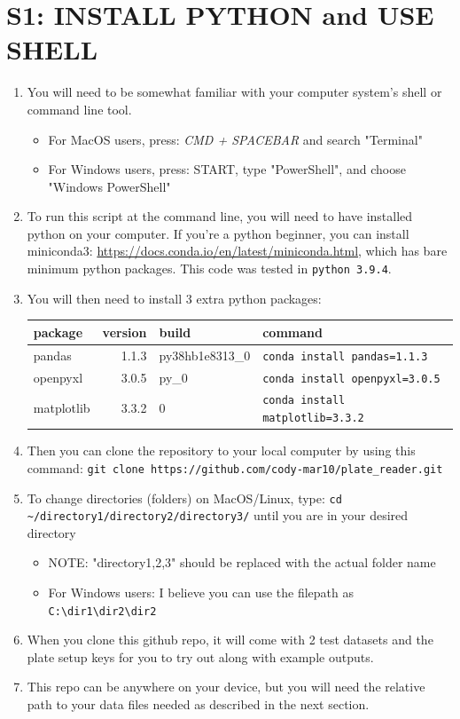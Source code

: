 \documentclass[12pt]{article}
\begin{document}
\section*{S1: INSTALL PYTHON and USE SHELL}
\label{sec:org2a9973f}
\begin{enumerate}
\item You will need to be somewhat familiar with your computer system's shell or command line tool.
\begin{itemize}
\item For MacOS users, press: \emph{CMD + SPACEBAR} and search "Terminal"
\item For Windows users, press: START, type "PowerShell", and choose "Windows PowerShell"
\end{itemize}

\item To run this script at the command line, you will need to have installed python on your computer. If you're a python beginner, you can install miniconda3: \url{https://docs.conda.io/en/latest/miniconda.html}, which has bare minimum python packages. This code was tested in \texttt{python 3.9.4}.

\item You will then need to install 3 extra python packages:
\begin{center}
\begin{tabular}{lrll}
package & version & build & command\\
\hline
pandas & 1.1.3 & py38hb1e8313\_0 & \texttt{conda install pandas=1.1.3}\\
openpyxl & 3.0.5 & py\_0 & \texttt{conda install openpyxl=3.0.5}\\
matplotlib & 3.3.2 & 0 & \texttt{conda install matplotlib=3.3.2}\\
\end{tabular}
\end{center}

\item Then you can clone the repository to your local computer by using this command: \texttt{git clone https://github.com/cody-mar10/plate\_reader.git}

\item To change directories (folders) on MacOS/Linux, type: \texttt{cd \textasciitilde{}/directory1/directory2/directory3/} until you are in your desired directory
\begin{itemize}
\item NOTE: "directory1,2,3" should be replaced with the actual folder name
\item For Windows users: I believe you can use the filepath as \texttt{C:\textbackslash{}dir1\textbackslash{}dir2\textbackslash{}dir2}
\end{itemize}

\item When you clone this github repo, it will come with 2 test datasets and the plate setup keys for you to try out along with example outputs.

\item This repo can be anywhere on your device, but you will need the relative path to your data files needed as described in the next section.
\end{enumerate}
\end{document}
